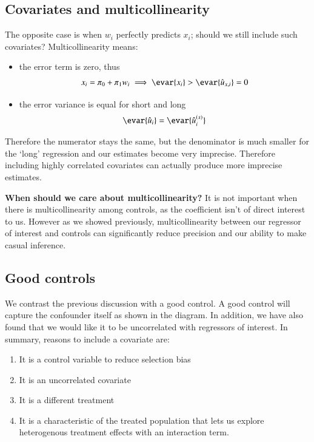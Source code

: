         \subsection{Covariates and multicollinearity}
            The opposite case is when $w_i$ perfectly predicts $x_i$; should we still include such covariates? Multicollinearity means:
            \begin{itemize}
                \item the error term is zero, thus
                \begin{align}
                    x_i = \pi_0 + \pi_1 w_i \implies \evar{x_i} > \evar{\hat u_{x,i}} = 0
                \end{align}
                
                \item the error variance is equal for short and long
                \begin{align}
                    \evar{\hat u_i} = \evar{\hat u^{(s)}_i}
                \end{align}
                
            \end{itemize}
            Therefore the numerator stays the same, but the denominator is much smaller for the `long' regression and our estimates become very imprecise. Therefore including highly correlated covariates can actually produce more imprecise estimates.
            
            \textbf{When should we care about multicollinearity?} It is not important when there is multicollinearity among controls, as the coefficient isn’t of direct interest to us. However as we showed previously, multicollinearity between our regressor of interest and controls can significantly reduce precision and our ability to make casual inference.

            
        \subsection{Good controls}
            We contrast the previous discussion with a good control. A good control will capture the confounder itself as shown in the diagram. In addition, we have also found that we would like it to be uncorrelated with regressors of interest. In summary, reasons to include a covariate are:
            \begin{enumerate}
                \item It is a control variable to reduce selection bias
                \item It is an uncorrelated covariate
                \item It is a different treatment
                \item It is a characteristic of the treated population that lets us explore heterogenous treatment effects with an interaction term.
            \end{enumerate}

